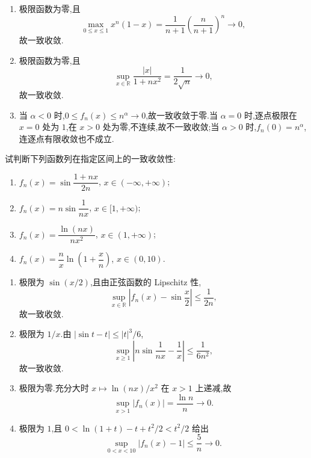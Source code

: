 \begin{solution}
    \leavevmode
    \begin{enumerate}
        \item 极限函数为零,且
              \[
                  \max_{0\leq x\leq1}x^n(1-x)
                  =\dfrac{1}{n+1}\left(\dfrac{n}{n+1}\right)^n\longrightarrow0,
              \]
              故一致收敛.
        \item 极限函数为零,且
              \[
                  \sup_{x\in\mathbb{R}}\dfrac{|x|}{1+nx^2}=\dfrac{1}{2\sqrt n}\longrightarrow0,
              \]
              故一致收敛.
        \item 当 $\alpha<0$ 时,$0\leq f_n(x)\leq n^\alpha\to0$,故一致收敛于零.当 $\alpha=0$ 时,逐点极限在 $x=0$ 处为 $1$,在 $x>0$ 处为零,不连续,故不一致收敛;当 $\alpha>0$ 时,$f_n(0)=n^\alpha$,连逐点有限收敛也不成立.
    \end{enumerate}
\end{solution}

\begin{example}
    试判断下列函数列在指定区间上的一致收敛性:
    \begin{enumerate}
        \item $f_n(x)=\sin\dfrac{1+nx}{2n}$, $x\in(-\infty,+\infty)$;
        \item $f_n(x)=n\sin\dfrac{1}{nx}$, $x\in\lbrack 1,+\infty)$;
        \item $f_n(x)=\dfrac{\ln(nx)}{nx^2}$, $x\in(1,+\infty)$;
        \item $f_n(x)=\dfrac{n}{x}\ln\left(1+\dfrac{x}{n}\right)$, $x\in(0,10)$.
    \end{enumerate}
\end{example}
\exampleblank

\begin{solution}
    \leavevmode
    \begin{enumerate}
        \item 极限为 $\sin(x/2)$,且由正弦函数的 Lipschitz 性,
              \[
                  \sup_{x\in\mathbb{R}}\left|f_n(x)-\sin\dfrac{x}{2}\right|\leq\dfrac{1}{2n},
              \]
              故一致收敛.
        \item 极限为 $1/x$.由 $|\sin t-t|\leq|t|^3/6$,
              \[
                  \sup_{x\geq1}\left|n\sin\dfrac{1}{nx}-\dfrac{1}{x}\right|
                  \leq\dfrac{1}{6n^2},
              \]
              故一致收敛.
        \item 极限为零.充分大时 $x\mapsto\ln(nx)/x^2$ 在 $x>1$ 上递减,故
              \[
                  \sup_{x>1}|f_n(x)|=\dfrac{\ln n}{n}\longrightarrow0.
              \]
        \item 极限为 $1$,且 $0<\ln(1+t)-t+t^2/2<t^2/2$ 给出
              \[
                  \sup_{0<x<10}|f_n(x)-1|\leq\dfrac{5}{n}\longrightarrow0.
              \]
    \end{enumerate}
\end{solution}

